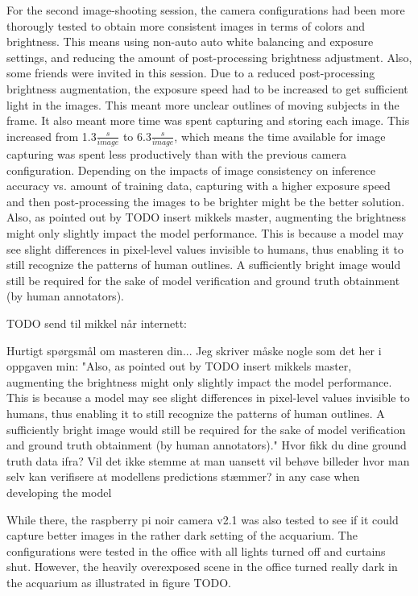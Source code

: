For the second image-shooting session, the camera configurations had been more thorougly tested to obtain more consistent images in terms of colors and brightness. This means using non-auto auto white balancing and exposure settings, and reducing the amount of post-processing brightness adjustment. Also, some friends were invited in this session. Due to a reduced post-processing brightness augmentation, the exposure speed had to be increased to get sufficient light in the images. This meant more unclear outlines of moving subjects in the frame. It also meant more time was spent capturing and storing each image. This increased from 1.3$\frac{s}{image}$ to 6.3$\frac{s}{image}$, which means the time available for image capturing was spent less productively than with the previous camera configuration. Depending on the impacts of image consistency on inference accuracy vs. amount of training data, capturing with a higher exposure speed and then post-processing the images to be brighter might be the better solution. Also, as pointed out by TODO insert mikkels master, augmenting the brightness might only slightly impact the model performance. This is because a model may see slight differences in pixel-level values invisible to humans, thus enabling it to still recognize the patterns of human outlines. A sufficiently bright image would still be required for the sake of model verification and ground truth obtainment (by human annotators). 




TODO send til mikkel når internett:

Hurtigt spørgsmål om masteren din... Jeg skriver måske nogle som det her i oppgaven min:
"Also, as pointed out by TODO insert mikkels master, augmenting the brightness might only slightly impact the model performance. This is because a model may see slight differences in pixel-level values invisible to humans, thus enabling it to still recognize the patterns of human outlines. A sufficiently bright image would still be required for the sake of model verification and ground truth obtainment (by human annotators)."
Hvor fikk du dine ground truth data ifra? Vil det ikke stemme at man uansett vil behøve billeder hvor man selv kan verifisere at modellens predictions stæmmer? in any case when developing the model






While there, the raspberry pi noir camera v2.1 was also tested to see if it could capture better images in the rather dark setting of the acquarium. The configurations were tested in the office with all lights turned off and curtains shut. However, the heavily overexposed scene in the office turned really dark in the acquarium as illustrated in figure TODO.

